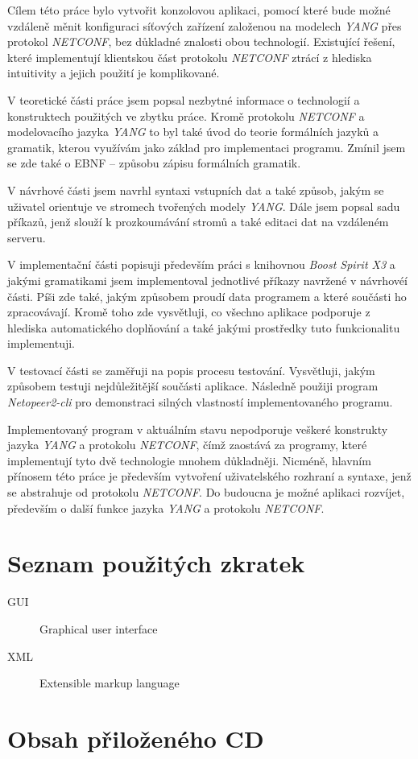 \documentclass[thesis=B,czech,hidelinks]{FITthesis}[2019/03/06]
\begin{document}
\begin{conclusion}
Cílem této práce bylo vytvořit konzolovou aplikaci, pomocí které bude možné vzdáleně měnit konfiguraci síťových zařízení založenou na modelech \textit{YANG} přes protokol \textit{NETCONF}, bez důkladné znalosti obou technologií. Existující řešení, které implementují klientskou část protokolu \textit{NETCONF} ztrácí z hlediska intuitivity a jejich použití je komplikované.

V teoretické části práce jsem popsal nezbytné informace o technologií a konstruktech použitých ve zbytku práce. Kromě protokolu \textit{NETCONF} a modelovacího jazyka \textit{YANG} to byl také úvod do teorie formálních jazyků a gramatik, kterou využívám jako základ pro implementaci programu. Zmínil jsem se zde také o EBNF -- způsobu zápisu formálních gramatik.

V návrhové části jsem navrhl syntaxi vstupních dat a také způsob, jakým se uživatel orientuje ve stromech tvořených modely \textit{YANG}. Dále jsem popsal sadu příkazů, jenž slouží k prozkoumávání stromů a také editaci dat na vzdáleném serveru.

V implementační části popisuji především práci s knihovnou \textit{Boost Spirit X3} a jakými gramatikami jsem implementoval jednotlivé příkazy navržené v návrhovéí části. Píši zde také, jakým způsobem proudí data programem a které součásti ho zpracovávají. Kromě toho zde vysvětluji, co všechno aplikace podporuje z hlediska automatického doplňování a také jakými prostředky tuto funkcionalitu implementuji.

V testovací části se zaměřuji na popis procesu testování. Vysvětluji, jakým způsobem testuji nejdůležitější součásti aplikace. Následně použiji program \textit{Netopeer2-cli} pro demonstraci silných vlastností implementovaného programu.

Implementovaný program v aktuálním stavu nepodporuje veškeré konstrukty jazyka \textit{YANG} a protokolu \textit{NETCONF}, čímž zaostává za programy, které implementují tyto dvě technologie mnohem důkladněji. Nicméně, hlavním přínosem této práce je především vytvoření uživatelského rozhraní a syntaxe, jenž se abstrahuje od protokolu \textit{NETCONF}. Do budoucna je možné aplikaci rozvíjet, především o další funkce jazyka \textit{YANG} a protokolu \textit{NETCONF}.
\end{conclusion}

\printbibliography{}

\appendix

\chapter{Seznam použitých zkratek}
\begin{description}
    \item[GUI] Graphical user interface
    \item[XML] Extensible markup language
\end{description}

\chapter{Obsah přiloženého CD}

\end{document}
